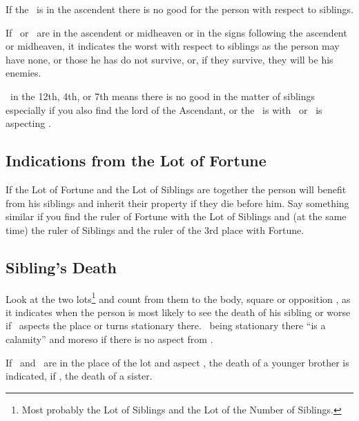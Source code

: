 If the \Sun\, is in the ascendent there is no good for the person with respect to siblings.

If \Mars\, or \Saturn\, are in the ascendent or midheaven or in the signs following the ascendent or midheaven, it indicates the worst with respect to siblings as the person may have none, or those he has do not survive, or, if they survive, they will be his enemies.

\Mars\, in the 12th, 4th, or 7th means there is no good in the matter of siblings especially if you also find the lord of the Ascendant, or the \Moon\,  is with \Mars\, or \Mars\, is aspecting \Mercury.

\subsection{Indications from the Lot of Fortune}
If the Lot of Fortune and the Lot of Siblings are together the person will benefit from his siblings and inherit their property if they die before him. Say something similar if you find the ruler of Fortune with the Lot of Siblings and (at the same time) the ruler of Siblings  and the ruler of the 3rd place with Fortune.

\subsection{Sibling's Death}
Look at the two lots\footnote{Most probably the Lot of Siblings and the Lot of the Number of Siblings.} and count from them to the body, square or opposition \Saturn, as it indicates when the person is most likely to see the death of his sibling or worse if \Mars\, aspects the place or turns stationary there. \Mars\, being stationary there ``is a calamity'' and moreso if there is no aspect from \Jupiter.

If \Saturn\, and \Mars\,  are in the place of the lot and aspect \Mercury, the death of a younger brother is indicated, if \Venus, the death of a sister.